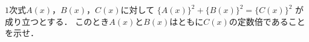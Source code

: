 $1$次式$A(x)$，$B(x)$，$C(x)$に対して
$\{A(x)\}^2+\{B(x)\}^2=\{C(x)\}^2$
が成り立つとする．
このとき$A(x)$と$B(x)$はともに$C(x)$の定数倍であることを示せ．

